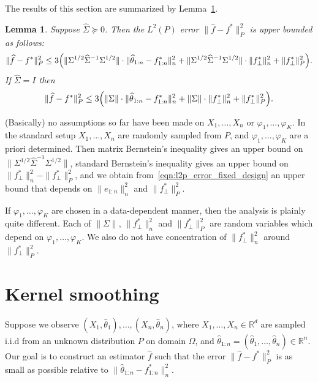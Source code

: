 \documentclass{article}
\newcommand{\Reals}{\mathbb{R}}
\newcommand{\1}{\mathbf{1}}
\newcommand{\Leb}{L}
\newcommand{\wh}[1]{\widehat{#1}}
\newtheorem{lemma}{Lemma}
\theoremstyle{definition}
\theoremstyle{remark}
\begin{document}
The results of this section are summarized by Lemma~\ref{lem:l2p_error_fixed_design}. 
\begin{lemma}
	\label{lem:l2p_error_fixed_design}
	Suppose $\wh{\Sigma} \succeq 0$. Then the $\Leb^2(P)$ error $\|\wh{f} - f^{\ast}\|_P^2$ is upper bounded as follows:
	\begin{equation}
	\label{eqn:l2p_error_fixed_design}
	\|\wh{f} - f^{\ast}\|_P^2 \leq 3\Bigl(\|\Sigma^{1/2} \wh{\Sigma}^{-1} \Sigma^{1/2}\| \cdot \|\wh{\theta}_{1:n} - {f}^{\ast}_{1:n}\|_n^2 + \|\Sigma^{1/2} \wh{\Sigma}^{-1} \Sigma^{1/2}\| \cdot \|f_{\perp}^{\ast}\|_n^2 + \|f_{\perp}^{\ast}\|_P^2\Bigr).
	\end{equation}
	If $\wh{\Sigma} = I$ then
	\begin{equation}
	\label{eqn:l2p_error_fixed_design_identity}
	\|\wh{f} - f^{\ast}\|_P^2 \leq 3\Bigl(\|\Sigma\| \cdot \|\wh{\theta}_{1:n} - {f}^{\ast}_{1:n}\|_n^2 + \|\Sigma\| \cdot \|f_{\perp}^{\ast}\|_n^2 + \|f_{\perp}^{\ast}\|_P^2\Bigr).
	\end{equation}
\end{lemma}
(Basically) no assumptions so far have been made on $X_1,\ldots,X_n$ or $\varphi_1,\ldots,\varphi_K$. In the standard setup $X_1,\ldots,X_n$ are randomly sampled from $P$, and $\varphi_1,\ldots,\varphi_K$ are a priori determined. Then matrix Bernstein's inequality gives an upper bound on $\|\Sigma^{1/2} \wh{\Sigma}^{-1} \Sigma^{1/2}\|$, standard Bernstein's inequality gives an upper bound on $\|f_{\perp}^{\ast}\|_n^2 - \|f_{\perp}^{\ast}\|_P^2$, and we obtain from~\eqref{eqn:l2p_error_fixed_design} an upper bound that depends on $\|e_{1:n}\|_n^2$ and $\|f_{\perp}^{\ast}\|_P^2$.  

If $\varphi_1,\ldots,\varphi_{K}$ are chosen in a data-dependent manner, then the analysis is plainly quite different. Each of $\|\Sigma\|$, $\|f_{\perp}^{\ast}\|_n^2$ and $\|f_{\perp}^{\ast}\|_P^2$ are random variables which depend on $\varphi_1,\ldots,\varphi_K$. We also do not have concentration of $\|f_{\perp}^{\ast}\|_n^2$ around $\|f_{\perp}^{\ast}\|_P^2$. 

\section{Kernel smoothing}
Suppose we observe $(X_1,\wh{\theta}_1),\ldots,(X_n,\wh{\theta}_n)$, where $X_1,\ldots,X_n \in \Reals^d$ are sampled i.i.d from an unknown distribution $P$ on domain $\Omega$, and $\wh{\theta}_{1:n} = (\wh{\theta}_1,\ldots,\wh{\theta}_n) \in \Reals^n$. Our goal is to construct an estimator $\wh{f}$ such that the error $\|\wh{f} - f^{\ast}\|_P^2$ is as small as possible relative to $\|\wh{\theta}_{1:n} - f^{\ast}_{1:n}\|_n^2$.
\end{document}
